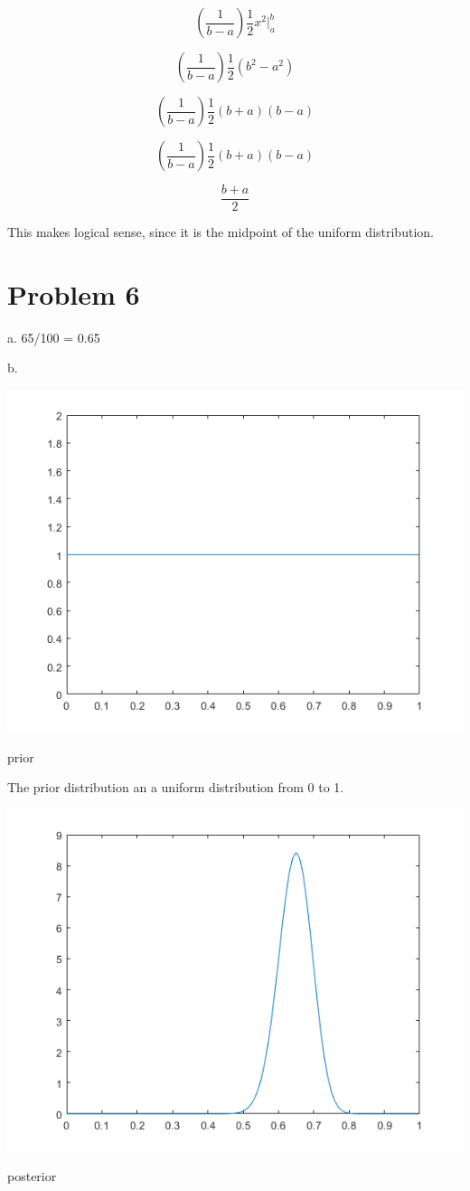 \documentclass[a4paper]{article}
\begin{document}
\[ (\frac{1}{b-a}) \frac{1}{2}x^2 \Big|_a^b  \]

\[ (\frac{1}{b-a}) \frac{1}{2}(b^2-a^2)  \]

\[ (\frac{1}{b-a}) \frac{1}{2}(b+a)(b-a)  \]

\[ (\frac{1}{b-a}) \frac{1}{2}(b+a)(b-a)  \]

\[ \frac{b+a}{2}  \]

\noindent
This makes logical sense, since it is the midpoint of the uniform distribution.

\section{Problem 6}

a. 65/100 = 0.65

\noindent
b. 

\begin{center}
    \includegraphics[scale=1]{6-b-prior.png}
    \caption{prior}
\end{center}

The prior distribution an a uniform distribution from 0 to 1.

\begin{center}
    \includegraphics[scale=1]{6-b.png}
    \caption{posterior}
\end{center}
\end{document}
